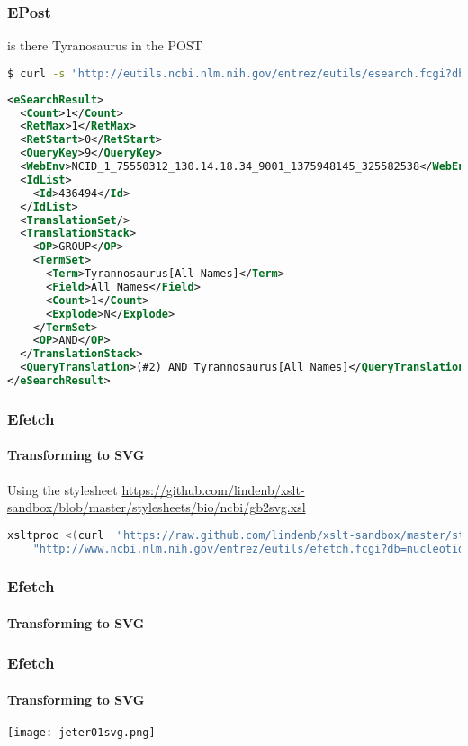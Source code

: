 \documentclass{beamer}
\begin{document}
\begin{frame}[fragile]
\frametitle{EPost}
is there Tyranosaurus in the POST

\begin{lstlisting}[language=bash,basicstyle=\tiny,breaklines=true,escapechar=\!]
$ curl -s "http://eutils.ncbi.nlm.nih.gov/entrez/eutils/esearch.fcgi?db=taxonomy&term=!\color{red}{Tyrannosaurus}!&usehistory=y&WebEnv=NCID_1_75550312_130.14.18.34_9001_1375948145_325582538&query_key=2"
\end{lstlisting}

\begin{lstlisting}[language=xml,basicstyle=\tiny,breaklines=true,escapechar=\%]
<eSearchResult>
  <Count>1</Count>
  <RetMax>1</RetMax>
  <RetStart>0</RetStart>
  <QueryKey>9</QueryKey>
  <WebEnv>NCID_1_75550312_130.14.18.34_9001_1375948145_325582538</WebEnv>
  <IdList>
    <Id>436494</Id>
  </IdList>
  <TranslationSet/>
  <TranslationStack>
    <OP>GROUP</OP>
    <TermSet>
      <Term>Tyrannosaurus[All Names]</Term>
      <Field>All Names</Field>
      <Count>1</Count>
      <Explode>N</Explode>
    </TermSet>
    <OP>AND</OP>
  </TranslationStack>
  <QueryTranslation>(#2) AND Tyrannosaurus[All Names]</QueryTranslation>
</eSearchResult>
\end{lstlisting}
\end{frame}

\begin{frame}[fragile]
\frametitle{Efetch}
\framesubtitle{Transforming to SVG}

Using the stylesheet \url{https://github.com/lindenb/xslt-sandbox/blob/master/stylesheets/bio/ncbi/gb2svg.xsl}

\begin{lstlisting}[language=bash,basicstyle=\tiny,breaklines=true,escapechar=\!]
xsltproc <(curl  "https://raw.github.com/lindenb/xslt-sandbox/master/stylesheets/bio/ncbi/gb2svg.xsl") \
	"http://www.ncbi.nlm.nih.gov/entrez/eutils/efetch.fcgi?db=nucleotide&id=14971102&retmode=xml&rettype=gbc"
\end{lstlisting}
\end{frame}

\begin{frame}[fragile]
\frametitle{Efetch}
\framesubtitle{Transforming to SVG}

\end{frame}

\begin{frame}[fragile]
\frametitle{Efetch}
\framesubtitle{Transforming to SVG}
\begin{center}
\texttt{[image: jeter01svg.png]}
\end{center}
\end{frame}
\end{document}
